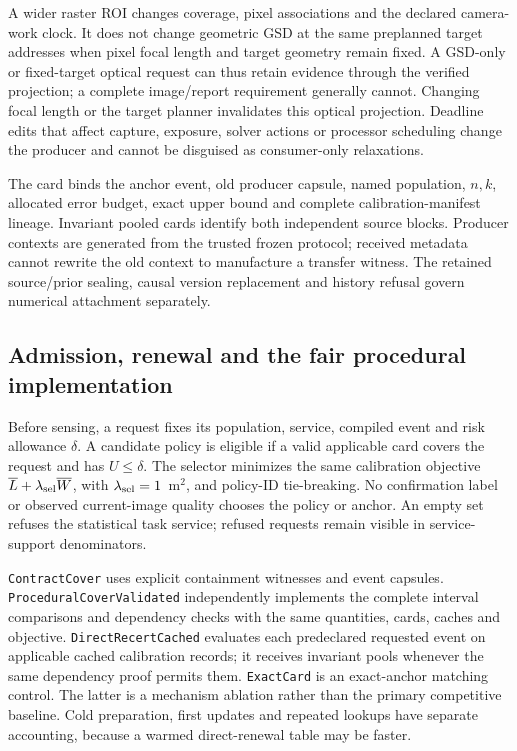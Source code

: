 A wider raster ROI changes coverage, pixel associations and the declared camera-work clock. It does not change geometric GSD at the same preplanned target addresses when pixel focal length and target geometry remain fixed. A GSD-only or fixed-target optical request can thus retain evidence through the verified projection; a complete image/report requirement generally cannot. Changing focal length or the target planner invalidates this optical projection. Deadline edits that affect capture, exposure, solver actions or processor scheduling change the producer and cannot be disguised as consumer-only relaxations.

The card binds the anchor event, old producer capsule, named population, $n,k$, allocated error budget, exact upper bound and complete calibration-manifest lineage. Invariant pooled cards identify both independent source blocks. Producer contexts are generated from the trusted frozen protocol; received metadata cannot rewrite the old context to manufacture a transfer witness. The retained source/prior sealing, causal version replacement and history refusal govern numerical attachment separately.

\subsection{Admission, renewal and the fair procedural implementation}
Before sensing, a request fixes its population, service, compiled event and risk allowance $\delta$. A candidate policy is eligible if a valid applicable card covers the request and has $U\le\delta$. The selector minimizes the same calibration objective $\overline L+\lambda_{\rm sel}\overline W$, with $\lambda_{\rm sel}=1$~m$^2$, and policy-ID tie-breaking. No confirmation label or observed current-image quality chooses the policy or anchor. An empty set refuses the statistical task service; refused requests remain visible in service-support denominators.

\texttt{ContractCover} uses explicit containment witnesses and event capsules. \texttt{ProceduralCoverValidated} independently implements the complete interval comparisons and dependency checks with the same quantities, cards, caches and objective. \texttt{DirectRecertCached} evaluates each predeclared requested event on applicable cached calibration records; it receives invariant pools whenever the same dependency proof permits them. \texttt{ExactCard} is an exact-anchor matching control. The latter is a mechanism ablation rather than the primary competitive baseline. Cold preparation, first updates and repeated lookups have separate accounting, because a warmed direct-renewal table may be faster.
